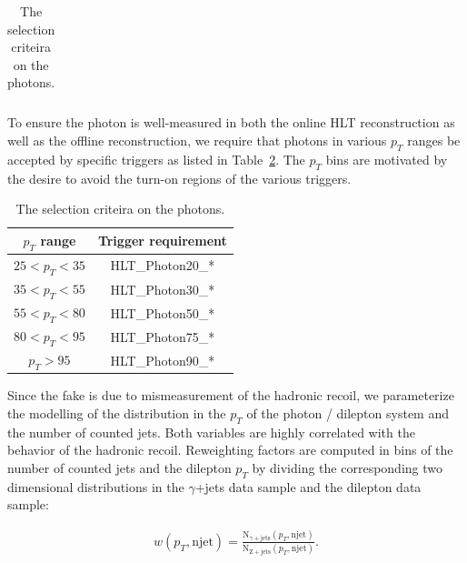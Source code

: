 \begin{table}[!ht]
\begin{center}
\begin{tabular}{|c|c|}
\end{tabular}
\caption{The selection criteira on the photons.
\label{tab:PhotonSelection}}
\end{center}
\end{table}

To ensure the photon is well-measured in both the online HLT reconstruction as well as the offline reconstruction, we require that photons in
various $p_T$ ranges be accepted by specific triggers as listed in Table~\ref{tab:PhotonTriggerPtBins}. The $p_T$ bins are motivated by the
desire to avoid the turn-on regions of the various triggers.
\begin{table}[!ht]
\begin{center}
\begin{tabular}{|c|c|} 
\hline
$p_T$ range     & Trigger requirement \\
\hline
$25 < p_T < 35$ & HLT\_Photon20\_* \\
$35 < p_T < 55$ & HLT\_Photon30\_* \\
$55 < p_T < 80$ & HLT\_Photon50\_* \\
$80 < p_T < 95$ & HLT\_Photon75\_* \\
$p_T > 95$      & HLT\_Photon90\_* \\
\hline
\end{tabular}
\caption{The selection criteira on the photons.
\label{tab:PhotonTriggerPtBins}}
\end{center}
\end{table}

Since the fake \met is due to mismeasurement of the hadronic recoil, we parameterize the 
modelling of the \met distribution in the $p_{T}$ of the photon / dilepton system and 
the number of counted jets. Both variables are highly correlated with the behavior 
of the hadronic recoil. Reweighting factors are computed in bins of the number of counted jets
and the dilepton $p_{T}$ by dividing the corresponding two dimensional distributions
in the $\gamma$+jets data sample and the dilepton data sample:

\begin{eqnarray}
  w(p_{T},\mathrm{njet}) = \frac{\mathrm{N}_{\gamma+\mathrm{jets}}(p_{T},\mathrm{njet})}{\mathrm{N}_{\mathrm{Z+jets}}(p_{T},\mathrm{njet})}.
\end{eqnarray}

